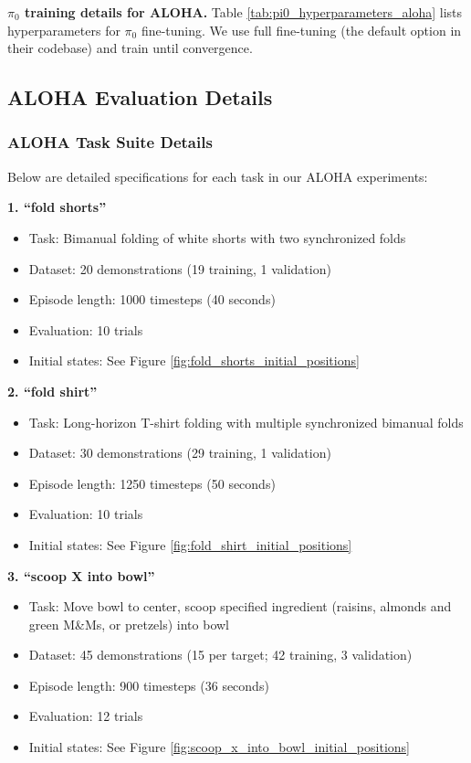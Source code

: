 \documentclass[conference]{IEEEtran}
\begin{document}
\textbf{$\pi_0$ training details for ALOHA.} Table \ref{tab:pi0_hyperparameters_aloha} lists hyperparameters for $\pi_0$ fine-tuning. We use full fine-tuning (the default option in their codebase) and train until convergence.










\subsection{ALOHA Evaluation Details}
\label{app:aloha_eval_details}

\subsubsection{ALOHA Task Suite Details}

Below are detailed specifications for each task in our ALOHA experiments:

\textbf{1. ``fold shorts''}
\begin{itemize}
    \item Task: Bimanual folding of white shorts with two synchronized folds
    \item Dataset: 20 demonstrations (19 training, 1 validation)
    \item Episode length: 1000 timesteps (40 seconds)
    \item Evaluation: 10 trials
    \item Initial states: See Figure \ref{fig:fold_shorts_initial_positions}
\end{itemize}

\textbf{2. ``fold shirt''}
\begin{itemize}
    \item Task: Long-horizon T-shirt folding with multiple synchronized bimanual folds
    \item Dataset: 30 demonstrations (29 training, 1 validation)
    \item Episode length: 1250 timesteps (50 seconds)
    \item Evaluation: 10 trials
    \item Initial states: See Figure \ref{fig:fold_shirt_initial_positions}
\end{itemize}

\textbf{3. ``scoop X into bowl''}
\begin{itemize}
    \item Task: Move bowl to center, scoop specified ingredient (raisins, almonds and green M\&Ms, or pretzels) into bowl
    \item Dataset: 45 demonstrations (15 per target; 42 training, 3 validation)
    \item Episode length: 900 timesteps (36 seconds)
    \item Evaluation: 12 trials
    \item Initial states: See Figure \ref{fig:scoop_x_into_bowl_initial_positions}
\end{itemize}
\end{document}
